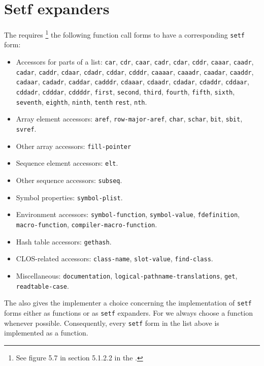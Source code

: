 \chapter{Setf expanders}

The \hs{} requires%
\footnote{See figure 5.7 in section 5.1.2.2 in the \hs{}.} 
the following function call forms to have a corresponding
\texttt{setf} form:

\begin{itemize}
\item Accessors for parts of a list: \texttt{car}, \texttt{cdr},
  \texttt{caar}, \texttt{cadr}, \texttt{cdar}, \texttt{cddr},
  \texttt{caaar}, \texttt{caadr}, \texttt{cadar}, \texttt{caddr},
  \texttt{cdaar}, \texttt{cdadr}, \texttt{cddar}, \texttt{cdddr},
  \texttt{caaaar}, \texttt{caaadr}, \texttt{caadar}, \texttt{caaddr},
  \texttt{cadaar}, \texttt{cadadr}, \texttt{caddar}, \texttt{cadddr},
  \texttt{cdaaar}, \texttt{cdaadr}, \texttt{cdadar}, \texttt{cdaddr},
  \texttt{cddaar}, \texttt{cddadr}, \texttt{cdddar}, \texttt{cddddr},
  \texttt{first}, \texttt{second}, \texttt{third}, \texttt{fourth},
  \texttt{fifth}, \texttt{sixth}, \texttt{seventh}, \texttt{eighth},
  \texttt{ninth}, \texttt{tenth} \texttt{rest}, \texttt{nth}.
\item Array element accessors: \texttt{aref}, \texttt{row-major-aref},
  \texttt{char}, \texttt{schar}, \texttt{bit}, \texttt{sbit},
  \texttt{svref}.
\item Other array accessors: \texttt{fill-pointer}
\item Sequence element accessors: \texttt{elt}.
\item Other sequence accessors: \texttt{subseq}.
\item Symbol properties: \texttt{symbol-plist}.
\item Environment accessors: \texttt{symbol-function},
  \texttt{symbol-value}, \texttt{fdefinition},
  \texttt{macro-function}, \texttt{compiler-macro-function}.
\item Hash table accessors: \texttt{gethash}.
\item CLOS-related accessors: \texttt{class-name},
  \texttt{slot-value}, \texttt{find-class}.
\item Miscellaneous: \texttt{documentation},
  \texttt{logical-pathname-translations}, \texttt{get},
  \texttt{readtable-case}.
\end{itemize}

The \hs{} also gives the implementer a choice concerning the
implementation of \texttt{setf} forms either as functions or as
\texttt{setf} expanders.  For \sysname{} we always choose a function
whenever possible.  Consequently, every \texttt{setf} form in
the list above is implemented as a function.


